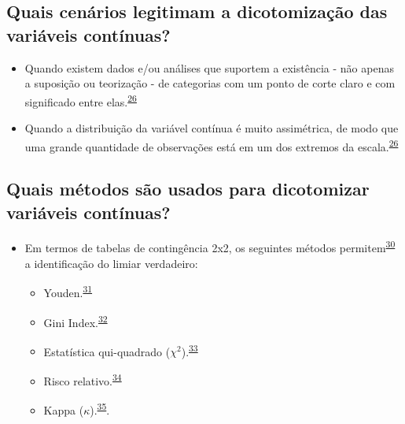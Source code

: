 \documentclass[
]{book}
\begin{document}
\hypertarget{quais-cenuxe1rios-legitimam-a-dicotomizauxe7uxe3o-das-variuxe1veis-contuxednuas}{%
\subsection{Quais cenários legitimam a dicotomização das variáveis contínuas?}\label{quais-cenuxe1rios-legitimam-a-dicotomizauxe7uxe3o-das-variuxe1veis-contuxednuas}}

\begin{itemize}
\item
  Quando existem dados e/ou análises que suportem a existência - não apenas a suposição ou teorização - de categorias com um ponto de corte claro e com significado entre elas.\textsuperscript{\protect\hyperlink{ref-MacCallum2002}{26}}
\item
  Quando a distribuição da variável contínua é muito assimétrica, de modo que uma grande quantidade de observações está em um dos extremos da escala.\textsuperscript{\protect\hyperlink{ref-MacCallum2002}{26}}
\end{itemize}

\hypertarget{quais-muxe9todos-suxe3o-usados-para-dicotomizar-variuxe1veis-contuxednuas}{%
\subsection{Quais métodos são usados para dicotomizar variáveis contínuas?}\label{quais-muxe9todos-suxe3o-usados-para-dicotomizar-variuxe1veis-contuxednuas}}

\begin{itemize}
\item
  Em termos de tabelas de contingência 2x2, os seguintes métodos permitem\textsuperscript{\protect\hyperlink{ref-Prince2017}{30}} a identificação do limiar verdadeiro:

  \begin{itemize}
  \item
    Youden.\textsuperscript{\protect\hyperlink{ref-YOUDEN1950}{31}}
  \item
    Gini Index.\textsuperscript{\protect\hyperlink{ref-strobl2007}{32}}
  \item
    Estatística qui-quadrado (\(\chi^2\)).\textsuperscript{\protect\hyperlink{ref-pearson1900}{33}}
  \item
    Risco relativo.\textsuperscript{\protect\hyperlink{ref-Greiner2000}{34}}
  \item
    Kappa (\(\kappa\)).\textsuperscript{\protect\hyperlink{ref-fleiss1971}{35}}.
  \end{itemize}
\end{itemize}
\end{document}
